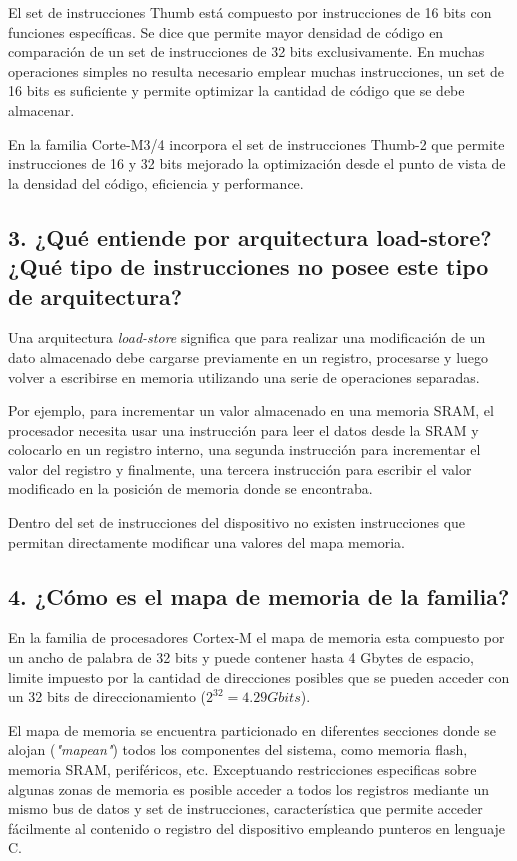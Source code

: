 \documentclass[10pt,a4paper,twoside,spanish]{article}	%
\begin{document}
El set de instrucciones Thumb está compuesto por instrucciones de 16 bits con funciones específicas. Se dice que permite mayor densidad de código en comparación de un set de instrucciones de 32 bits exclusivamente. En muchas operaciones simples no resulta necesario emplear muchas instrucciones, un set de 16 bits es suficiente y permite optimizar la cantidad de código que se debe almacenar. 

En la familia Corte-M3/4 incorpora el set de instrucciones Thumb-2 que permite instrucciones de 16 y 32 bits mejorado la optimización desde el punto de vista de la densidad del código, eficiencia y performance. 
     

\subsection*{3. ¿Qué entiende por arquitectura load-store? ¿Qué tipo de instrucciones no posee este tipo de arquitectura?}


Una arquitectura \textit{load-store} significa que para realizar una modificación de un dato almacenado debe cargarse previamente en un registro, procesarse y luego volver a escribirse en memoria utilizando una serie de operaciones separadas. 

Por ejemplo, para incrementar un valor almacenado en una memoria SRAM, el procesador necesita usar una instrucción para leer el datos desde la SRAM y colocarlo en un registro interno, una segunda instrucción para incrementar el valor del registro y finalmente, una tercera instrucción para escribir el valor modificado en la posición de memoria donde se encontraba.  

Dentro del set de instrucciones del dispositivo no existen instrucciones que permitan directamente modificar una valores del mapa memoria.


\subsection*{4. ¿Cómo es el mapa de memoria de la familia?}

En la familia de procesadores Cortex-M el mapa de memoria esta compuesto por un ancho de palabra de 32 bits y puede contener hasta 4 Gbytes de espacio, limite impuesto por la cantidad de direcciones posibles que se pueden acceder con un 32 bits de direccionamiento ($2^{32}=4.29 Gbits$).

El mapa de memoria se encuentra particionado en diferentes secciones donde se alojan (\textit{"mapean"}) todos los componentes del sistema, como memoria flash, memoria SRAM, periféricos, etc. Exceptuando restricciones especificas sobre algunas zonas de memoria es posible acceder a todos los registros mediante un mismo bus de datos y set de instrucciones, característica que permite acceder fácilmente al contenido o registro del dispositivo empleando punteros en lenguaje C.  
\end{document}
